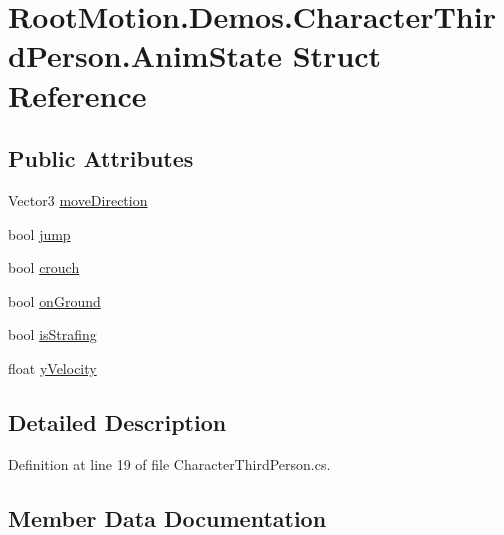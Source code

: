 \hypertarget{struct_root_motion_1_1_demos_1_1_character_third_person_1_1_anim_state}{}\section{Root\+Motion.\+Demos.\+Character\+Third\+Person.\+Anim\+State Struct Reference}
\label{struct_root_motion_1_1_demos_1_1_character_third_person_1_1_anim_state}
\subsection*{Public Attributes}
\begin{DoxyCompactItemize}
\item 
Vector3 \mbox{\hyperlink{struct_root_motion_1_1_demos_1_1_character_third_person_1_1_anim_state_a6ba191655ddab8b12cb059e2bc7657e4}{move\+Direction}}
\item 
bool \mbox{\hyperlink{struct_root_motion_1_1_demos_1_1_character_third_person_1_1_anim_state_a7d164c7af54aebadc767f81a68f72557}{jump}}
\item 
bool \mbox{\hyperlink{struct_root_motion_1_1_demos_1_1_character_third_person_1_1_anim_state_ae4261d7e01b7f072195b6dbe6e9d2880}{crouch}}
\item 
bool \mbox{\hyperlink{struct_root_motion_1_1_demos_1_1_character_third_person_1_1_anim_state_a1fc510e583c36a7326199efde667590d}{on\+Ground}}
\item 
bool \mbox{\hyperlink{struct_root_motion_1_1_demos_1_1_character_third_person_1_1_anim_state_aa56c1589f89994f90d37612a2e7828c3}{is\+Strafing}}
\item 
float \mbox{\hyperlink{struct_root_motion_1_1_demos_1_1_character_third_person_1_1_anim_state_a8624337facb4f80cd19796658cc3af9a}{y\+Velocity}}
\end{DoxyCompactItemize}


\subsection{Detailed Description}


Definition at line 19 of file Character\+Third\+Person.\+cs.



\subsection{Member Data Documentation}
\mbox{\label{struct_root_motion_1_1_demos_1_1_character_third_person_1_1_anim_state_ae4261d7e01b7f072195b6dbe6e9d2880}} 
